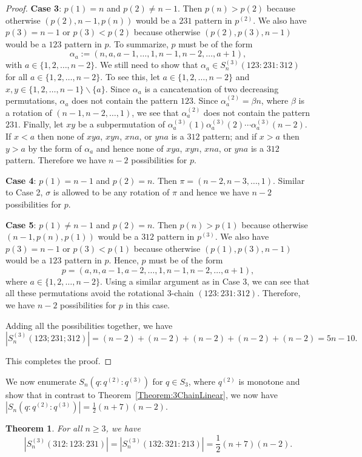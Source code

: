 \documentclass[10pt,a4paper]{amsart}
\newtheorem{theorem}{Theorem}[section]
\newcommand{\half}{{\textstyle\frac12}}
\numberwithin{equation}{section}
\begin{document}
\begin{proof}
{\bf Case 3}: $p(1)=n$ and $p(2)\neq n-1$. Then $p(n)>p(2)$ because otherwise $(p(2),n-1,p(n))$ would be a $231$ pattern in $p^{(2)}$.
We also have $p(3)=n-1$ or $p(3)<p(2)$ because otherwise $(p(2),p(3),n-1)$ would be a $123$ pattern in $p$. To summarize, $p$ must be of the form \[\alpha_a:=(n,a,a-1,\ldots,1,n-1,n-2,\ldots,a+1),\]
with $a\in\{1,2,\ldots,n-2\}$. We still need to show that $\alpha_a\in S_n^{(3)}(123:231:312)$ for all $a\in\{1,2,\ldots,n-2\}$. To see this, let $a\in\{1,2,\ldots,n-2\}$ and $x,y\in\{1,2,\ldots,n-1\}\backslash\{a\}$. Since $\alpha_a$ is a cancatenation of two decreasing permutations, $\alpha_a$ does not contain the pattern $123$. Since $\alpha_a^{(2)}=\beta n$, where $\beta$ is a rotation of $(n-1,n-2,\ldots,1)$, we see that $\alpha_a^{(2)}$ does not contain the pattern $231$. Finally, let $xy$ be a 
subpermutation of $\alpha_a^{(3)}(1)\alpha_a^{(3)}(2)\cdots\alpha_a^{(3)}(n-2)$. If $x<a$ then none of $xya$, $xyn$, $xna$, or $yna$ is a $312$ pattern; and if $x>a$ then $y>a$ by the form of $\alpha_a$ and hence none of $xya$, $xyn$, $xna$, or $yna$ is a $312$ pattern. 
Therefore we have $n-2$ possibilities for $p$.

{\bf Case 4}: $p(1)=n-1$ and $p(2)=n$. Then $\pi=(n-2,n-3,\ldots,1)$. Similar to Case 2, $\sigma$ is allowed to be any rotation of $\pi$ and hence we have $n-2$ possibilities for $p$.

{\bf Case 5}: $p(1)\neq n-1$ and $p(2)=n$. Then $p(n)>p(1)$ because otherwise $(n-1,p(n),p(1))$ would be a $312$ pattern in $p^{(3)}$. We also have $p(3)=n-1$ or $p(3)<p(1)$ because otherwise $(p(1),p(3),n-1)$ would be a $123$ pattern in $p$. Hence, $p$ must be of the form
\[p=(a,n,a-1,a-2,\ldots,1,n-1,n-2,\ldots,a+1),
\]
where $a\in\{1,2,\ldots,n-2\}$. Using a similar argument as in Case 3, we can see that all these permutations avoid the rotational 3-chain $(123:231:312)$. Therefore, we have $n-2$ possibilities for $p$ in this case.

Adding all the possibilities together, we have \[|S_n^{(3)}(123;231;312)|=(n-2)+(n-2)+(n-2)+(n-2)+(n-2)=5n-10.\]

This completes the proof.
\end{proof}

We now enumerate $S_n(q:q^{(2)}:q^{(3)})$ for $q\in S_3$, where $q^{(2)}$ is monotone
and show that in contrast to Theorem~\ref{Theorem:3ChainLinear}, we now have $|S_n(q:q^{(2)}:q^{(3)})|=\half (n+7)(n-2)$.


\begin{theorem}\label{Theorem:3ChainQuadratic}
    For all $n\geq3$, we have
    \[
    |S_n^{(3)}(312:123:231)|=|S_n^{(3)}(132:321:213)|=\half (n+7)(n-2).
    \]
\end{theorem}
\end{document}
